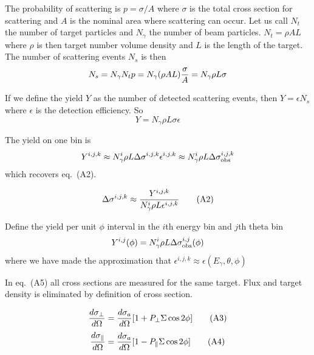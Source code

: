 \documentclass{article}
\begin{document}
The probability of scattering is $p = \sigma/A$ where $\sigma$ is the total cross section for scattering and $A$ is the nominal area where scattering can occur. Let us call $N_t$ the number of target particles and $N_\gamma$ the number of beam particles. $N_t = \rho AL$ where $\rho$ is then target number volume density and $L$ is the length of the target. The number of scattering events $N_s$ is then
\begin{equation}
N_s = N_\gamma N_t p = N_\gamma(\rho A L){\sigma\over A} = N_\gamma\rho L\sigma
\end{equation}

If we define the yield $Y$ as the number of detected scattering events, then $Y = \epsilon N_s$ where $\epsilon$ is the detection efficiency. So
\begin{equation}
Y = N_\gamma\rho L\sigma\epsilon
\end{equation}

The yield on one bin is
\begin{equation}
Y^{i,j,k} \approx N^i_\gamma\rho L\Delta\sigma^{i,j,k}\epsilon^{i,j,k} \\
\approx N^i_\gamma\rho L\Delta\sigma^{i,j,k}_{\rm obs}
\end{equation}
which recovers eq.~(A2).

\begin{equation}
  \Delta\sigma^{i,j,k} \approx { Y^{i,j,k} \over N^i_\gamma \rho L \epsilon^{i,j,k}}
  \tag{A2}
\end{equation}

Define the yield per unit $\phi$ interval in the $i$th energy bin and $j$th theta bin
\begin{equation}
Y^{i,j}(\phi) = N^i_\gamma\rho L\Delta\sigma^{i,j}_{\rm obs}(\phi)
\end{equation}
where we have made the approximation that $\epsilon^{i,j,k} \approx \epsilon(E_\gamma,\theta,\phi)$

In eq.~(A5) all cross sections are measured for the same target. Flux and target density is eliminated by definition of cross section.

\begin{equation}
{d\sigma_\perp \over d\Omega} = {d\sigma_a \over d\Omega}[1+P_\perp\Sigma\cos 2\phi] \tag{A3} \\
\end{equation}
\begin{equation}
{d\sigma_\parallel \over d\Omega} = {d\sigma_a \over d\Omega}[1-P_\parallel\Sigma\cos 2\phi] \tag{A4} \\
\end{equation}
\end{document}
